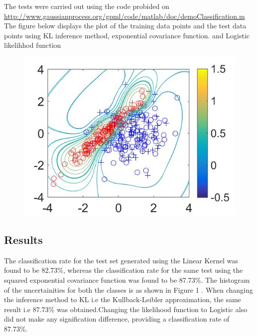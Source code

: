 \documentclass[12pt]{article}
\begin{document}
The tests were carried out using the code probided on \url{http://www.gaussianprocess.org/gpml/code/matlab/doc/demoClassification.m}
The figure below displays the plot of the training data points and the test data points using KL inference method, exponential covariance function. and Logistic likelihhod function

\begin{figure}[!t]
\centering
\includegraphics[width=6.5in]{plot11}
\end{figure}


\subsection{Results}



The classification rate for the test set generated  using the Linear Kernel was found to be 82.73\%, whereas the classification rate for the same test using the squared exponential covariance function was found to be 87.73\%. The histogram of the uncertainities for both the classes is as shown in Figure 1 . When changing the inference method to KL i.e the Kullback-Leibler approximation, the same result i.e 87.73\% was obtained.Changing the likelihood function to Logistic also did not make any signification difference, providing a classification rate of 87.73\%.
\end{document}
